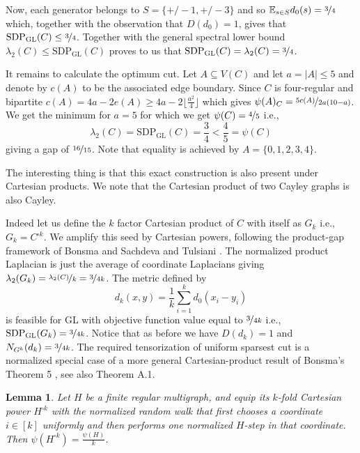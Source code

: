 \documentclass[11pt]{article}
\newtheorem{lemma}[theorem]{Lemma}
\theoremstyle{definition}
\theoremstyle{remark}
\newcommand{\gl}{\operatorname{SDP_{GL}}}
\begin{document}

Now, each generator belongs to $S = \{ +/-1, +/-3 \}$ and so $\mathbb E_{s\in S}d_0(s) = \nicefrac{3}{4}$ which, together with the observation that $D(d_0) =1$, gives that $\operatorname{SDP_{GL}}(C)\leq \nicefrac{3}{4}$. Together with the general spectral lower bound $\lambda_2(C)\leq \gl(C)$ proves to us that $\operatorname{SDP_{GL}}(C)=\lambda_2(C)=\nicefrac{3}{4}$.

It remains to calculate the  optimum cut. Let $A \subseteq V(C)$ and let $a= |A| \leq 5$ and denote by $c(A)$ to be the associated edge boundary. Since $C$ is four-regular and bipartite $c(A)=4a - 2e(A) \geq 4a - 2 \lfloor \frac{a^2}{4} \rfloor$ which gives $\psi(A)_C = \nicefrac{5c(A)}{2a(10 - a)}$. We get the minimum for $a=5$ for which we get $\psi(C) = \nicefrac{4}{5}$ i.e., 
\[
\lambda_2(C) = \gl(C) = \frac{3}{4} < \frac{4}{5} = \psi(C)
\]
giving a gap of $\nicefrac{16}{15}$. Note that equality is achieved by $A = \{0,1,2,3,4\}$.

The interesting thing is that this exact construction is also present under Cartesian products. We note that the Cartesian product of two Cayley graphs is also Cayley. 

Indeed let us define the $k$ factor Cartesian product of $C$ with itself as $G_k$ i.e., $G_k = C^{\square k} $. We amplify this seed by Cartesian powers, following the product-gap framework of Bonsma \cite{bonsmatensor} and Sachdeva and Tulsiani \cite{DBLP:journals/corr/abs-1105-3383}. The normalized product Laplacian is just the average of coordinate Laplacians giving $\lambda_2(G_k) = \nicefrac{\lambda_2(C)}{k} = \nicefrac{3}{4k}$. The metric defined by
\[
d_k (x,y) = \frac{1}{k} \sum_{i=1}^k d_0(x_i - y_i)
\]
is feasible for GL  with objective function value equal to $\nicefrac{3}{4k}$ i.e., $\gl(G_k) = \nicefrac{3}{4k}$. Notice that as before we have $D(d_k)=1 $ and $N_{G^k} (d_k) = \nicefrac{3}{4k}$.
The required tensorization of uniform sparsest cut is a normalized special case of a more general Cartesian-product result of Bonsma's Theorem 5 \cite{bonsmatensor}, see also \cite{DBLP:journals/corr/abs-1105-3383} Theorem A.1. 

\begin{lemma}
\label{lem:cartesian-tensorization}
Let $H$ be a finite regular multigraph, and equip its $k$-fold
Cartesian power $H^{\square k}$ with the normalized random walk that
first chooses a coordinate $i\in[k]$ uniformly and then performs one
normalized $H$-step in that coordinate. Then $\psi(H^{\square k})=\frac{\psi(H)}{k}$.
\end{lemma}
\end{document}
